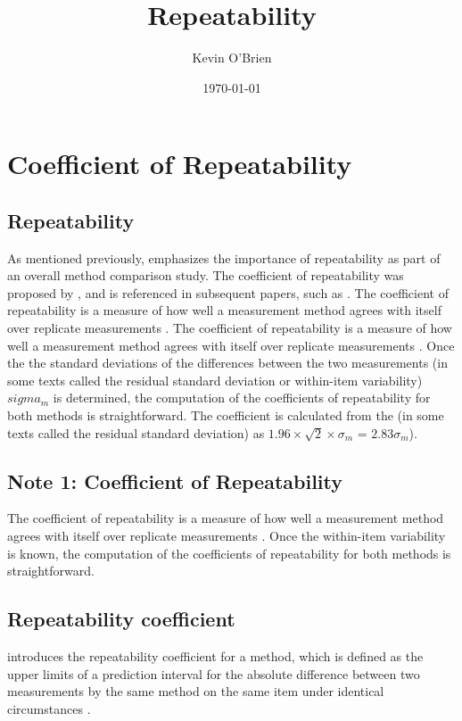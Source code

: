 \documentclass[12pt, a4paper]{article}
\begin{document}
	\author{Kevin O'Brien}
	\title{Repeatability}
	\date{\today}
	\maketitle
\tableofcontents
\newpage
	\newpage
	\section{Coefficient of Repeatability}
	\subsection{Repeatability}
	As mentioned previously, \citet{Barnhart} emphasizes the importance of repeatability as part of an overall method comparison study. The coefficient of repeatability was proposed by \citet{BA99}, and is referenced in subsequent papers, such as \citet{BXC2008}. The coefficient of repeatability is a measure of how well a
	measurement method agrees with itself over replicate measurements
	\citep{BA99}. The coefficient of repeatability is a measure of how well a
	measurement method agrees with itself over replicate measurements
	\citep{BA99}. Once the the standard deviations of the differences between the two measurements (in some texts called the residual standard deviation or within-item variability) $sigma_m$ is determined, the
	computation of the coefficients of repeatability for both methods
	is straightforward. The coefficient is calculated from the (in some texts called the residual standard deviation) as  $1.96 \times \sqrt{2} \times \sigma_m$ = $2.83 \sigma_m$).
	
	\subsection{Note 1: Coefficient of Repeatability}
The coefficient of repeatability is a measure of how well a
measurement method agrees with itself over replicate measurements
\citep{BA99}. Once the within-item variability is known, the
computation of the coefficients of repeatability for both methods
is straightforward.


	
	\subsection{Repeatability coefficient}
	\citet{BA99} introduces the repeatability coefficient for a method, which is defined as the upper limits of a prediction interval for the absolute difference between two measurements by the same
	method on the same item under identical circumstances \citep{BXC2008}.
	
\end{document}
